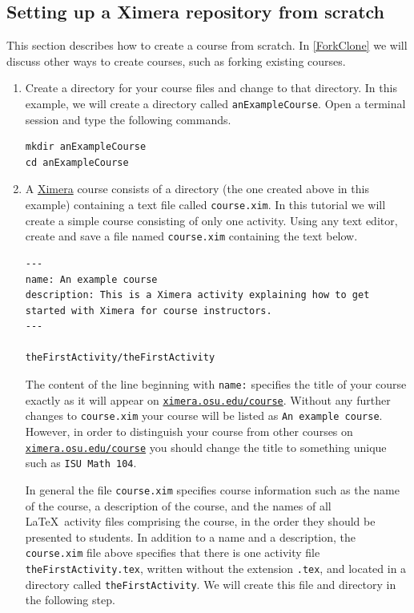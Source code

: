 \documentclass{ximera}
\begin{document}
\subsection{Setting up a Ximera repository from scratch}
This section describes how to create a course from scratch.
In \autoref{ForkClone} we will discuss other ways to create
courses, such as forking existing courses.
\begin{enumerate}
\item\label{Mkdir} Create a directory for your course files
and change to that directory.
In this example, we will create a directory called
\verb!anExampleCourse!.
Open a terminal session and type the following commands.
\begin{center}
\begin{verbatim}
mkdir anExampleCourse
cd anExampleCourse 
\end{verbatim}
\end{center}

\item A \href{http://ximera.osu.edu}{\sf Ximera} 
course consists of a directory (the one
created above in this example)
containing a text file called \verb!course.xim!. 
In this tutorial we will create a simple
course consisting of only one activity.
Using any text editor, create and save a file named
\verb!course.xim! containing the text below.

\begin{verbatim}
---
name: An example course
description: This is a Ximera activity explaining how to get started with Ximera for course instructors.
---

theFirstActivity/theFirstActivity
\end{verbatim}
\begin{warning}
The content of the line beginning with \verb!name:!
specifies the title of your course exactly as it will appear on
\href{http://ximera.osu.edu/course}{\tt ximera.osu.edu/course}.
Without any further changes to \verb!course.xim!
your course will be listed as \verb!An example course!.
However, in order to distinguish your course from
other courses on
\href{http://ximera.osu.edu/course}{\tt ximera.osu.edu/course}
you should change the title to something unique
such as \verb!ISU Math 104!.
\end{warning}

\begin{remark}
In general the file \verb!course.xim! specifies course information
such as the name of the course, a description of the course,
and the names of all \LaTeX\ activity files 
comprising the course, in the order
they should be presented to students.
In addition to a name and a description,
the \verb!course.xim! file above specifies that 
there is one activity file \verb!theFirstActivity.tex!,
written without the extension \verb!.tex!,  
and located in a directory called \verb!theFirstActivity!.
We will create this file and directory in the following step.


\end{remark}
\end{enumerate}
\end{document}
